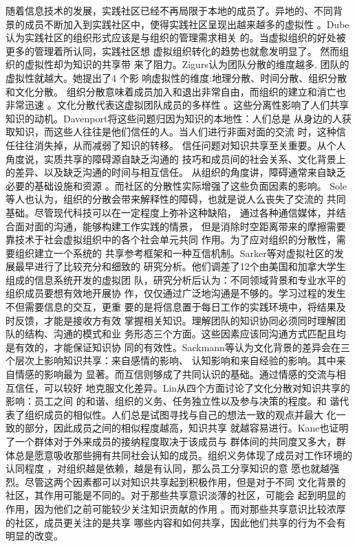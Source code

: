 \documentclass[12pt,a4paper,cs4size]{ctexart}
\begin{document}
随着信息技术的发展，实践社区已经不再局限于本地的成员了。异地的、不同背
景的成员不断加入到实践社区中，使得实践社区呈现出越来越多的虚拟性
\cite{preece2004eea}。Dube认为实践社区的组织形式应该是与组织的管理需求相关
的\cite{dube2006ttv}。当虚拟组织的好处被更多的管理着所认同，实践社区想
虚拟组织转化的趋势也就愈发明显了。  然而组织的虚拟性却为知识的共享带
来了阻力。Zigurs认为团队分散的维度越多, 团队的虚拟性就越大。她提出了4 个影
响虚拟性的维度:地理分散、时间分散、组织分散和文化分散\cite{ZIGURS2003}。
组织分散意味着成员加入和退出非常自由，而组织的建立和消亡也非常迅速
\cite{655269}。文化分散代表这虚拟团队成员的多样性
\cite{huangyouliandliutuanjie}。这些分离性影响了人们共享知识的动机。Davenport将这些问题归因为知识的本地性：人们总是
从身边的人获取知识，而这些人往往是他们信任的人。当人们进行非面对面的交流
时，这种信任往往消失掉，从而减弱了知识的转移\cite{davenport1998wko}。
信任问题对知识共享至关重要。从个人角度说，实质共享的障碍源自缺乏沟通的
技巧和成员间的社会关系、文化背景上的差异、以及缺乏沟通的时间与相互信任。
从组织的角度讲，障碍通常来自缺乏必要的基础设施和资源
\cite{riege2005tdk}。而社区的分散性实际增强了这些负面因素的影响。
Sole等人也认为，组织的分散会带来解释性的障碍，也就是说人么丧失了交流的
共同基础\cite{sole2000bkg}。尽管现代科技可以在一定程度上弥补这种缺陷，
通过各种通信媒体，并结合面对面的沟通，能够构建工作实践的情景\cite{robey2000slc}，
但是消除时空距离带来的摩擦需要靠技术于社会虚拟组织中的各个社会单元共同
作用\cite{sarker2004isa}。为了应对组织的分散性，需要组织建立一个系统的
共享参考框架和一种互信机制。Sarker等\cite{sarker2000uvt}对虚拟社区的发展最早进行了比较充分和细致的
研究分析。他们调差了12个由美国和加拿大学生组成的信息系统开发的虚拟团
队，研究分析后认为：不同领域背景和专业水平的组织成员要想有效地开展协
作，仅仅通过广泛地沟通是不够的。学习过程的发生不但需要信息的交互，更重
要的是将信息置于每日工作的实践环境中，将结果及时反馈，才能是接收方有效
掌握相关知识。理解团队的知识协同必须同时理解团队的结构、沟通的模式和业
务形态三个方面。这些因素应该同沟通方式匹配且均是有效的，才能保证知识协
同的有效性。Sackmann等认为文化背景的差异会在三个层次上影响知识共享：来自感情的影响、
认知影响和来自经验的影响\cite{sackmann2007eci}。其中来自情感的影响最为
显著。而互信则够成了共同认识的基础。通过情感的交流与相互信任，可以较好
地克服文化差异。Lin从四个方面讨论了文化分散对知识共享的影响：员工之间
的和谐、组织的义务、任务独立性以及参与决策的程度\cite{lin2007son}。和
谐代表了组织成员的相似性。人们总是试图寻找与自己的想法一致的观点并最大
化一致的部分\cite{vianen2000pof}，因此成员之间的相似程度越高，知识共享
就越容易进行。Kane也证明了一个群体对于外来成员的接纳程度取决于该成员与
群体间的共同度又多大，群体总是愿意吸收那些拥有共同社会认知的成员\cite{Kanea2005}。组织义务体现了成员对工作环境的认同程度
\cite{testa2001ocj}，对组织越是依赖，越是有认同，那么员工分享知识的意
愿也就越强烈。尽管这两个因素都可以对知识共享起到积极作用，但是对于不同
文化背景的社区，其作用可能是不同的。对于那些共享意识淡薄的社区，可能会
起到明显的作用，因为他们之前可能较少关注知识贡献的作用
\cite{witt2001iep}。而对那些共享意识比较浓厚的社区，成员更关注的是共享
哪些内容和如何共享，因此他们共享的行为不会有明显的改变\cite{eisenberger2001rpo}。
\end{document}

